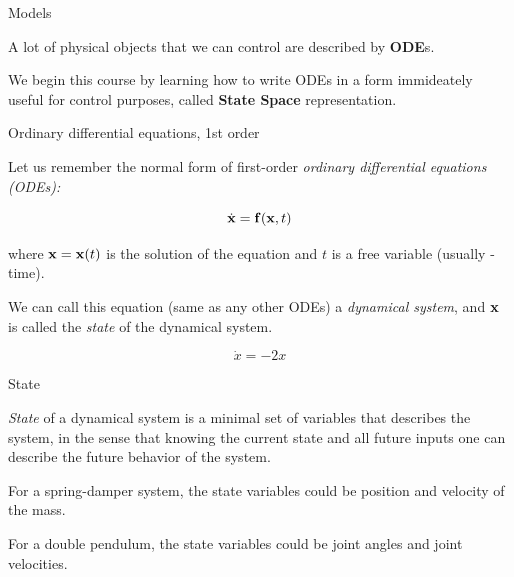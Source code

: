 \documentclass{beamer}
\begin{document}
\begin{frame}{Models}
	\begin{flushleft}
		
		A lot of physical objects that we can control are described by \textbf{ODE}s.
		
		\bigskip 
		
		We begin this course by learning how to write ODEs in a form immideately useful for control purposes, called \textbf{State Space} representation.
		
	\end{flushleft}
\end{frame}



\begin{frame}{Ordinary differential equations, 1st order}
\begin{flushleft}

Let us remember the normal form of first-order \emph{ordinary differential equations (ODEs):}

\begin{equation}
    \dot{\mathbf{x}} = \mathbf{f} (\mathbf{x}, t)
\end{equation}

where $\mathbf{x} = \mathbf{x}(t)$ is the solution of the equation and $t$ is a free variable (usually - time).

\bigskip

\begin{definition}
We can call this equation (same as any other ODEs) a \emph{dynamical system}, and $\mathbf{x}$ is called the \emph{state} of the dynamical system.  
\end{definition}

\begin{example}
\begin{equation}
    \dot{x} = -2 x
\end{equation}
\end{example}

\end{flushleft}
\end{frame}




\begin{frame}{State}
	\begin{flushleft}
		
		\emph{State} of a dynamical system is a minimal set of variables that describes the system, in the sense that knowing the current state and all future inputs one can describe the future behavior of the system.
		
		\begin{example}
			For a spring-damper system, the state variables could be position and velocity of the mass.
		\end{example} 
		\begin{example}
			For a double pendulum, the state variables could be joint angles and joint velocities.
		\end{example} 
		
	\end{flushleft}
\end{frame}
\end{document}
